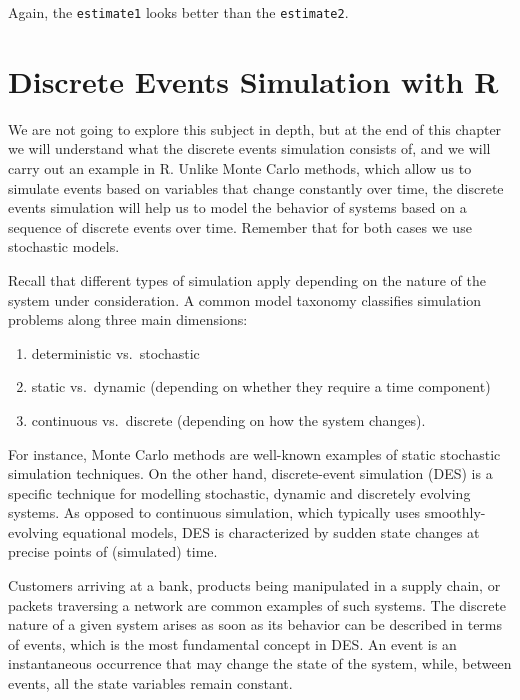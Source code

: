 \documentclass[
]{book}
\providecommand{\tightlist}{%
  \setlength{\itemsep}{0pt}\setlength{\parskip}{0pt}}
\theoremstyle{definition}
\theoremstyle{definition}
\theoremstyle{definition}
\theoremstyle{definition}
\theoremstyle{remark}
\begin{document}
Again, the \texttt{estimate1} looks better than the \texttt{estimate2}.

\hypertarget{discrete-events-simulation-with-r}{%
\chapter{Discrete Events Simulation with R}\label{discrete-events-simulation-with-r}}

We are not going to explore this subject in depth, but at the end of this chapter we will understand what the discrete events simulation consists of, and we will carry out an example in R. Unlike Monte Carlo methods, which allow us to simulate events based on variables that change constantly over time, the discrete events simulation will help us to model the behavior of systems based on a sequence of discrete events over time. Remember that for both cases we use stochastic models.

Recall that different types of simulation apply depending on the nature of the system under consideration. A common model taxonomy classifies simulation problems along three main dimensions:

\begin{enumerate}
\def\labelenumi{\arabic{enumi}.}
\tightlist
\item
  deterministic vs.~stochastic
\item
  static vs.~dynamic (depending on whether they require a time component)
\item
  continuous vs.~discrete (depending on how the system changes).
\end{enumerate}

For instance, Monte Carlo methods are well-known examples of static stochastic simulation techniques. On the other hand, discrete-event simulation (DES) is a specific technique for modelling stochastic, dynamic and discretely evolving systems. As opposed to continuous simulation, which typically uses smoothly-evolving equational models, DES is characterized by sudden state changes at precise points of (simulated) time.

Customers arriving at a bank, products being manipulated in a supply chain, or packets traversing a network are common examples of such systems. The discrete nature of a given system arises as soon as its behavior can be described in terms of events, which is the most fundamental concept in DES. An event is an instantaneous occurrence that may change the state of the system, while, between events, all the state variables remain constant.
\end{document}
